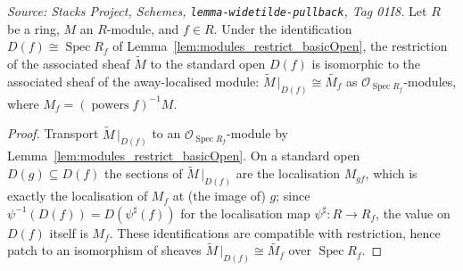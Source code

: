 \begin{lemma}
  \label{lem:tilde_restrict_basicOpen}
  \textit{Source: Stacks Project, Schemes, \texttt{lemma-widetilde-pullback}, Tag 01I8.}
  Let \(R\) be a ring, \(M\) an \(R\)-module, and \(f \in R\). Under the identification
  \(D(f) \cong \operatorname{Spec} R_f\) of Lemma~\ref{lem:modules_restrict_basicOpen}, the
  restriction of the associated sheaf \(\widetilde{M}\) to the standard open \(D(f)\) is
  isomorphic to the associated sheaf of the away-localised module:
  \(\widetilde{M}\,|_{D(f)} \cong \widetilde{M_f}\) as \(\mathcal{O}_{\operatorname{Spec}
  R_f}\)-modules, where \(M_f = (\operatorname{powers} f)^{-1} M\).
\end{lemma}
\begin{proof}
  Transport \(\widetilde{M}\,|_{D(f)}\) to an \(\mathcal{O}_{\operatorname{Spec}
  R_f}\)-module by Lemma~\ref{lem:modules_restrict_basicOpen}. On a standard open
  \(D(g) \subseteq D(f)\) the sections of \(\widetilde{M}\,|_{D(f)}\) are the localisation
  \(M_{gf}\), which is exactly the localisation of \(M_f\) at (the image of) \(g\); since
  \(\psi^{-1}(D(f)) = D(\psi^\sharp(f))\) for the localisation map \(\psi^\sharp : R \to R_f\),
  the value on \(D(f)\) itself is \(M_f\). These identifications are compatible with
  restriction, hence patch to an isomorphism of sheaves
  \(\widetilde{M}\,|_{D(f)} \cong \widetilde{M_f}\) over \(\operatorname{Spec} R_f\).
\end{proof}

